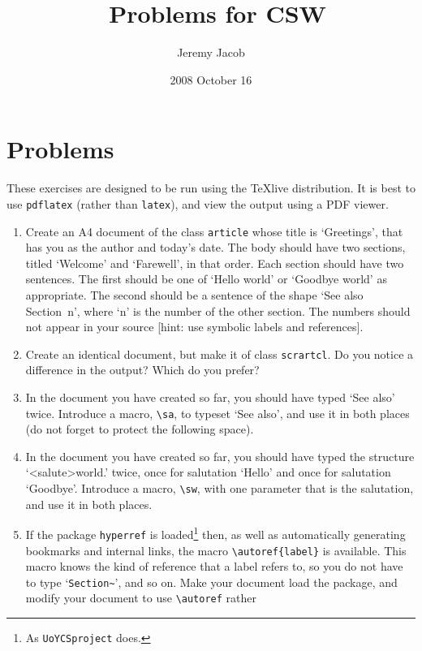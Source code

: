 \documentclass[12pt,14paper]{scrartcl}
\title{\LaTeXe\ Problems for CSW}
\author{Jeremy Jacob}
\date{2008 October 16}
\begin{document}
\maketitle

\section{Problems}

These exercises are designed to be run using the \TeX{}live
distribution.  It is best to use \lstinline{pdflatex} (rather than
\lstinline{latex}), and view the output using a PDF viewer.

\begin{enumerate}
\item Create an A4 document of the class \lstinline{article} whose
  title is `Greetings', that has you as the author and today's date.
  The body should have two sections, titled `Welcome' and `Farewell',
  in that order.  Each section should have two sentences.  The first
  should be one of `Hello world' or `Goodbye world' as appropriate.
  The second should be a sentence of the shape `See also Section~n',
  where `n' is the number of the other section.  The numbers should
  not appear in your source [hint: use symbolic labels and
  references].
\item Create an identical document, but make it of class
  \lstinline{scrartcl}.  Do you notice a difference in the output?
  Which do you prefer?
\item In the document you have created so far, you should have typed
  `See also' twice.  Introduce a macro, \lstinline{\sa}, to typeset
  `See also', and use it in both places (do not forget to protect the
  following space).
\item In the document you have created so far, you should have typed
  the structure `\textless salute\textgreater world.' twice, once for
  salutation `Hello' and once for salutation `Goodbye'.  Introduce a
  macro, \lstinline{\sw}, with one parameter that is the salutation,
  and use it in both places.
\item If the package \lstinline{hyperref} is loaded\footnote{As
    \lstinline{UoYCSproject} does.} then, as well as automatically
  generating bookmarks and internal links, the macro
  \lstinline|\autoref{label}| is available.  This macro knows the kind
  of reference that a label refers to, so you do not have to type
  `\lstinline|Section~|', and so on.  Make your document load the
  package, and modify your document to use \lstinline{\autoref} rather

\end{enumerate}
\end{document}
